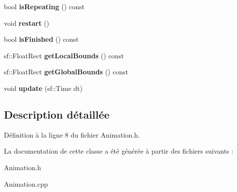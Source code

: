 \begin{DoxyCompactItemize}
\hypertarget{class_animation_aedcd2695ee980a41ff1fa65e0091f6a4}{}\label{class_animation_aedcd2695ee980a41ff1fa65e0091f6a4} 
bool {\bfseries is\+Repeating} () const
\item 
\hypertarget{class_animation_a17f07570ce8e26928fd1d99cfd9c63f0}{}\label{class_animation_a17f07570ce8e26928fd1d99cfd9c63f0} 
void {\bfseries restart} ()
\item 
\hypertarget{class_animation_a52f7a8449004b0248a3b7f8de9759cd0}{}\label{class_animation_a52f7a8449004b0248a3b7f8de9759cd0} 
bool {\bfseries is\+Finished} () const
\item 
\hypertarget{class_animation_a677e525e6b1f187fd6719bc511253a2b}{}\label{class_animation_a677e525e6b1f187fd6719bc511253a2b} 
sf\+::\+Float\+Rect {\bfseries get\+Local\+Bounds} () const
\item 
\hypertarget{class_animation_ad829ff72f859c44ea80b65aad5e7e5ae}{}\label{class_animation_ad829ff72f859c44ea80b65aad5e7e5ae} 
sf\+::\+Float\+Rect {\bfseries get\+Global\+Bounds} () const
\item 
\hypertarget{class_animation_a250fabaf23dab62bd373daac39aa25d3}{}\label{class_animation_a250fabaf23dab62bd373daac39aa25d3} 
void {\bfseries update} (sf\+::\+Time dt)
\end{DoxyCompactItemize}


\subsection{Description détaillée}


Définition à la ligne 8 du fichier Animation.\+h.



La documentation de cette classe a été générée à partir des fichiers suivants \+:\begin{DoxyCompactItemize}
\item 
Animation.\+h\item 
Animation.\+cpp\end{DoxyCompactItemize}

